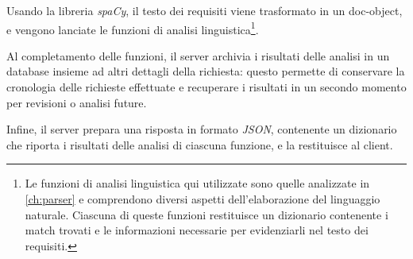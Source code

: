 \documentclass[12pt]{report}
\newcommand{\spacy}{\textsl{spaCy}\xspace}
\newcommand{\json}{\textsl{JSON}\xspace}
\begin{document}
Usando la libreria \spacy, il testo dei requisiti viene trasformato in un doc-object, e vengono lanciate le funzioni di analisi linguistica\footnote{Le funzioni di analisi linguistica qui utilizzate sono quelle analizzate in \cref{ch:parser} e comprendono diversi aspetti dell'elaborazione del linguaggio naturale. Ciascuna di queste funzioni restituisce un dizionario contenente i match trovati e le informazioni necessarie per evidenziarli nel testo dei requisiti.}.

Al completamento delle funzioni, il server archivia i risultati delle analisi in un database insieme ad altri dettagli della richiesta: questo permette di conservare la cronologia delle richieste effettuate e recuperare i risultati in un secondo momento per revisioni o analisi future.

Infine, il server prepara una risposta in formato \json, contenente un dizionario che riporta i risultati delle analisi di ciascuna funzione, e la restituisce al client.
\end{document}
